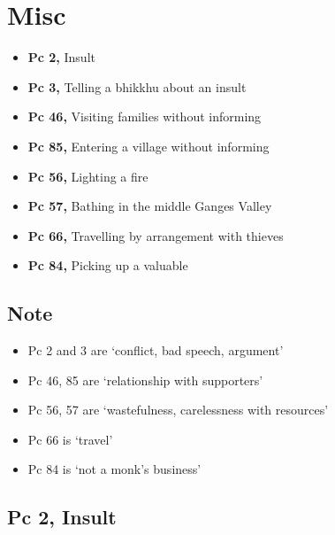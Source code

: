 \chapter{Misc}

\begin{itemize}
\tightlist
\item
  \textbf{Pc 2,} Insult
\item
  \textbf{Pc 3,} Telling a bhikkhu about an insult
\item
  \textbf{Pc 46,} Visiting families without informing
\item
  \textbf{Pc 85,} Entering a village without informing
\item
  \textbf{Pc 56,} Lighting a fire
\item
  \textbf{Pc 57,} Bathing in the middle Ganges Valley
\item
  \textbf{Pc 66,} Travelling by arrangement with thieves
\item
  \textbf{Pc 84,} Picking up a valuable
\end{itemize}

\section{Note}

\begin{itemize}
\tightlist
\item
  Pc 2 and 3 are `conflict, bad speech, argument'
\item
  Pc 46, 85 are `relationship with supporters'
\item
  Pc 56, 57 are `wastefulness, carelessness with resources'
\item
  Pc 66 is `travel'
\item
  Pc 84 is `not a monk's business'
\end{itemize}

\section{Pc 2, Insult}

